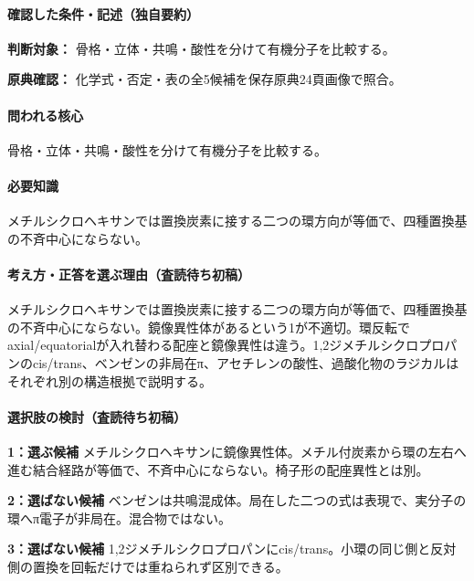 \paragraph{確認した条件・記述（独自要約）}\mbox{}\par

\noindent\textbf{判断対象：} 骨格・立体・共鳴・酸性を分けて有機分子を比較する。\par

\noindent\textbf{原典確認：} 化学式・否定・表の全5候補を保存原典24頁画像で照合。\par

\paragraph{問われる核心} 骨格・立体・共鳴・酸性を分けて有機分子を比較する。

\paragraph{必要知識} メチルシクロヘキサンでは置換炭素に接する二つの環方向が等価で、四種置換基の不斉中心にならない。

\paragraph{考え方・正答を選ぶ理由（査読待ち初稿）} メチルシクロヘキサンでは置換炭素に接する二つの環方向が等価で、四種置換基の不斉中心にならない。鏡像異性体があるという1が不適切。環反転でaxial/equatorialが入れ替わる配座と鏡像異性は違う。1,2ジメチルシクロプロパンのcis/trans、ベンゼンの非局在π、アセチレンの酸性、過酸化物のラジカルはそれぞれ別の構造根拠で説明する。

\paragraph{選択肢の検討（査読待ち初稿）}\mbox{}\par

\noindent\textbf{1：選ぶ候補} メチルシクロヘキサンに鏡像異性体。メチル付炭素から環の左右へ進む結合経路が等価で、不斉中心にならない。椅子形の配座異性とは別。\par

\noindent\textbf{2：選ばない候補} ベンゼンは共鳴混成体。局在した二つの式は表現で、実分子の環へπ電子が非局在。混合物ではない。\par

\noindent\textbf{3：選ばない候補} 1,2ジメチルシクロプロパンにcis/trans。小環の同じ側と反対側の置換を回転だけでは重ねられず区別できる。\par

